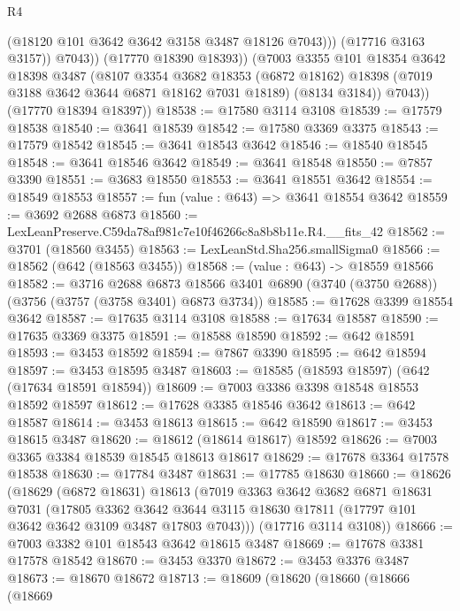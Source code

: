 \begin{lexlean}{R4}
\begin{coremodule}
                    (@18120 @101 @3642 @3642 @3158 @3487 @18126 @7043)))
                (@17716 @3163 @3157))
              @7043))
          (@17770 @18390 @18393))
        (@7003
          @3355
          @101
          @18354
          @3642
          @18398
          @3487
          (@8107
            @3354
            @3682
            @18353
            (@6872 @18162)
            @18398
            (@7019 @3188 @3642 @3644 @6871 @18162 @7031 @18189)
            (@8134 @3184))
          @7043))
      (@17770 @18394 @18397))
@18538 := @17580 @3114 @3108
@18539 := @17579 @18538
@18540 := @3641 @18539
@18542 := @17580 @3369 @3375
@18543 := @17579 @18542
@18545 := @3641 @18543 @3642
@18546 := @18540 @18545
@18548 := @3641 @18546 @3642
@18549 := @3641 @18548
@18550 := @7857 @3390
@18551 := @3683 @18550
@18553 := @3641 @18551 @3642
@18554 := @18549 @18553
@18557 := fun (value : @643) => @3641 @18554 @3642
@18559 := @3692 @2688 @6873
@18560 := LexLeanPreserve.C59da78af981c7e10f46266c8a8b8b11e.R4.__fits_42
@18562 := @3701 (@18560 @3455)
@18563 := LexLeanStd.Sha256.smallSigma0
@18566 := @18562 (@642 (@18563 @3455))
@18568 := (value : @643) -> @18559 @18566
@18582 := @3716
    @2688
    @6873
    @18566
    @3401
    @6890
    (@3740 (@3750 @2688))
    (@3756 (@3757 (@3758 @3401) @6873 @3734))
@18585 := @17628 @3399 @18554 @3642
@18587 := @17635 @3114 @3108
@18588 := @17634 @18587
@18590 := @17635 @3369 @3375
@18591 := @18588 @18590
@18592 := @642 @18591
@18593 := @3453 @18592
@18594 := @7867 @3390
@18595 := @642 @18594
@18597 := @3453 @18595 @3487
@18603 := @18585 (@18593 @18597) (@642 (@17634 @18591 @18594))
@18609 := @7003 @3386 @3398 @18548 @18553 @18592 @18597
@18612 := @17628 @3385 @18546 @3642
@18613 := @642 @18587
@18614 := @3453 @18613
@18615 := @642 @18590
@18617 := @3453 @18615 @3487
@18620 := @18612 (@18614 @18617) @18592
@18626 := @7003 @3365 @3384 @18539 @18545 @18613 @18617
@18629 := @17678 @3364 @17578 @18538
@18630 := @17784 @3487
@18631 := @17785 @18630
@18660 := @18626
    (@18629
      (@6872 @18631)
      @18613
      (@7019
        @3363
        @3642
        @3682
        @6871
        @18631
        @7031
        (@17805
          @3362
          @3642
          @3644
          @3115
          @18630
          @17811
          (@17797 @101 @3642 @3642 @3109 @3487 @17803 @7043)))
      (@17716 @3114 @3108))
@18666 := @7003 @3382 @101 @18543 @3642 @18615 @3487
@18669 := @17678 @3381 @17578 @18542
@18670 := @3453 @3370
@18672 := @3453 @3376 @3487
@18673 := @18670 @18672
@18713 := @18609
    (@18620
      (@18660
        (@18666
          (@18669

\end{coremodule}
\end{lexlean}
